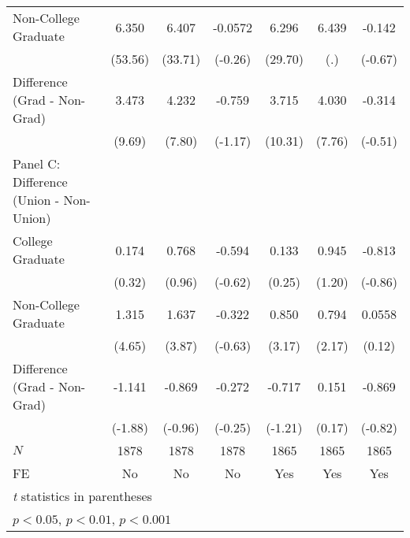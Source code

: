 \begin{table}[htbp]
\begin{tabular}{l*{6}{c}}
Non-College Graduate&       6.350\sym{***}&       6.407\sym{***}&     -0.0572         &       6.296\sym{***}&       6.439         &      -0.142         \\
            &     (53.56)         &     (33.71)         &     (-0.26)         &     (29.70)         &         (.)         &     (-0.67)         \\
Difference (Grad - Non-Grad)&       3.473\sym{***}&       4.232\sym{***}&      -0.759         &       3.715\sym{***}&       4.030\sym{***}&      -0.314         \\
            &      (9.69)         &      (7.80)         &     (-1.17)         &     (10.31)         &      (7.76)         &     (-0.51)         \\
\hline
Panel C: Difference (Union - Non-Union)&                     &                     &                     &                     &                     &                     \\
College Graduate&       0.174         &       0.768         &      -0.594         &       0.133         &       0.945         &      -0.813         \\
            &      (0.32)         &      (0.96)         &     (-0.62)         &      (0.25)         &      (1.20)         &     (-0.86)         \\
Non-College Graduate&       1.315\sym{***}&       1.637\sym{***}&      -0.322         &       0.850\sym{**} &       0.794\sym{*}  &      0.0558         \\
            &      (4.65)         &      (3.87)         &     (-0.63)         &      (3.17)         &      (2.17)         &      (0.12)         \\
Difference (Grad - Non-Grad)&      -1.141         &      -0.869         &      -0.272         &      -0.717         &       0.151         &      -0.869         \\
            &     (-1.88)         &     (-0.96)         &     (-0.25)         &     (-1.21)         &      (0.17)         &     (-0.82)         \\
\hline
\(N\)       &        1878         &        1878         &        1878         &        1865         &        1865         &        1865         \\
FE          &          No         &          No         &          No         &         Yes         &         Yes         &         Yes         \\
\hline\hline
\multicolumn{7}{l}{\footnotesize \textit{t} statistics in parentheses}\\
\multicolumn{7}{l}{\footnotesize \sym{*} \(p<0.05\), \sym{**} \(p<0.01\), \sym{***} \(p<0.001\)}\\
\end{tabular}
\end{table}

